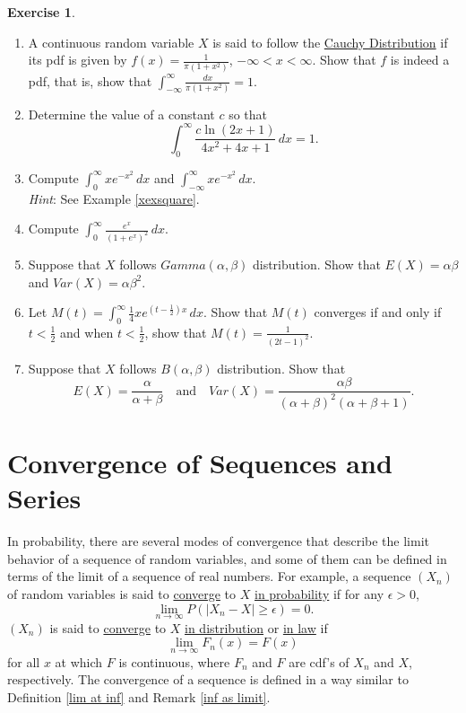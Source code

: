 \documentclass[12pt,letterpaper]{book}
\numberwithin{equation}{section}
\theoremstyle{definition}
\newtheorem{exercise}{\textbf{Exercise}}[chapter]
\begin{document}
\begin{exercise}\label{improperexer} \quad
\begin{enumerate}[\bfseries 1.]

\item A continuous random variable $X$ is said to follow the \underline{Cauchy Distribution} if its pdf is given by $f(x)=\frac{1}{\pi(1+x^2)}$, $-\infty<x<\infty$. Show that $f$ is indeed a pdf, that is, show that $\displaystyle{\int_{-\infty}^\infty \frac{dx}{\pi(1+x^2)}=1}$.

\item Determine the value of a constant $c$ so that
$$\int_0^\infty \frac{c\ln (2x+1)}{4x^2+4x+1}\,dx=1.$$

\item Compute $\displaystyle{\int_0^\infty xe^{-x^2}\,dx}$ and $\displaystyle{\int_{-\infty}^\infty xe^{-x^2}\,dx}$. \\\textit{Hint}: See Example \ref{xexsquare}.

\item Compute $\displaystyle{\int_0^\infty \frac{e^x}{(1+e^x)^2}\,dx}$.

\item\label{gammaexp} Suppose that $X$ follows $Gamma(\alpha,\beta)$ distribution. Show that $E(X)=\alpha\beta$ and $Var(X)=\alpha\beta^2$.

\item Let $M(t)=\displaystyle{\int_0^\infty \frac{1}{4}xe^{(t-\frac{1}{2})x}\,dx}$. Show that $M(t)$ converges if and only if $t<\frac{1}{2}$ and when $t<\frac{1}{2}$, show that $M(t)=\frac{1}{(2t-1)^2}$.

\item Suppose that $X$ follows $B(\alpha,\beta)$ distribution. Show that
$$E(X)=\frac{\alpha}{\alpha+\beta}\quad\text{and}\quad Var(X)=\frac{\alpha\beta}{(\alpha+\beta)^2(\alpha+\beta+1)}.$$
\end{enumerate}
\end{exercise}

\section{Convergence of Sequences and Series}

In probability, there are several modes of convergence that describe the limit behavior of a sequence of random variables, and some of them can be defined in terms of the limit of a sequence of real numbers. For example, a sequence $(X_n)$ of random variables is said to \underline{converge} to $X$ \underline{in probability} if for any $\epsilon>0$,
$$\lim_{n\to \infty} P(|X_n-X|\geq \epsilon)=0.$$
$(X_n)$ is said to \underline{converge} to $X$ \underline{in distribution} or \underline{in law} if
$$\lim_{n\to \infty} F_n(x)=F(x)$$
for all $x$ at which $F$ is continuous, where $F_n$ and $F$ are cdf's of $X_n$ and $X$, respectively. The convergence of a sequence is defined in a way similar to Definition \ref{lim at inf} and Remark \ref{inf as limit}.
\end{document}
